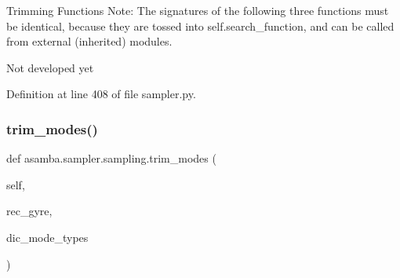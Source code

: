 Trimming Functions Note\+: The signatures of the following three functions must be identical, because they are tossed into self.\+search\+\_\+function, and can be called from external (inherited) modules. 

\begin{DoxyVerb}Not developed yet \end{DoxyVerb}
 

Definition at line 408 of file sampler.\+py.

\mbox{\label{classasamba_1_1sampler_1_1sampling_ad67c8918488194428f7733918a55a4a0}} 
\subsubsection{\texorpdfstring{trim\+\_\+modes()}{trim\_modes()}}
{\footnotesize\ttfamily def asamba.\+sampler.\+sampling.\+trim\+\_\+modes (\begin{DoxyParamCaption}\item[{}]{self,  }\item[{}]{rec\+\_\+gyre,  }\item[{}]{dic\+\_\+mode\+\_\+types }\end{DoxyParamCaption})}

